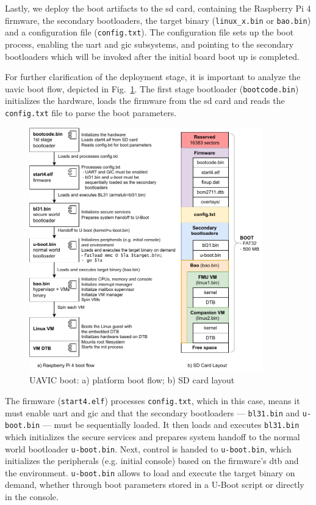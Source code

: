 Lastly, we deploy the boot artifacts to the \gls{sd} card, containing the
Raspberry Pi 4 firmware, the secondary bootloaders, the target binary
(\texttt{linux\_x.bin} or \texttt{bao.bin}) and a configuration file
(\texttt{config.txt}). The configuration file sets up the boot process, enabling
the \gls{uart} and \gls{gic} subsystems, and pointing to the secondary
bootloaders which will be invoked after the initial board boot up is completed.

For further clarification of the deployment stage, it is important to analyze
the \gls{uavic} boot flow, depicted in Fig.~\ref{fig:uav-main-rpi4-boot}. The
first stage bootloader (\texttt{bootcode.bin}) initializes the hardware, loads
the firmware from the \gls{sd} card and reads the \texttt{config.txt} file to
parse the boot parameters.

\begin{figure}[!hbt]
  \centering
  \includegraphics[width=0.9\textwidth]{./img/pdf/uav-main-rpi4-boot} 
  \caption{UAVIC boot: a) platform boot flow; b) SD card layout}%
  \label{fig:uav-main-rpi4-boot}
\end{figure}

The firmware (\texttt{start4.elf}) processes \texttt{config.txt}, which in this case,
means it must enable \gls{uart} and \gls{gic} and that the secondary bootloaders
--- \texttt{bl31.bin} and \texttt{u-boot.bin} ---
must be sequentially loaded. 
%
It then loads and executes \texttt{bl31.bin} which initializes the secure
services and prepares system handoff to the normal world bootloader
\texttt{u-boot.bin}.
%
Next, control is handed to \texttt{u-boot.bin}, which initializes the peripherals
(e.g. initial console) based on the firmware's \gls{dtb} and the
environment. \texttt{u-boot.bin} allows to load and execute the target binary on
demand, whether through boot parameters stored in a U-Boot script or directly in the console.

